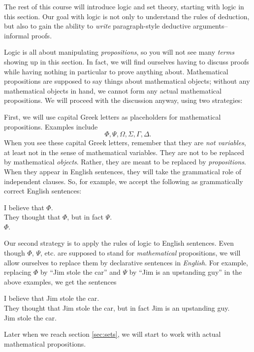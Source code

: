 \documentclass[12pt]{article}
\def\pA{\Phi}
\def\pB{\Psi}
\def\pC{\Omega}
\def\pD{\Sigma}
\def\pE{\Gamma}
\def\pF{\Delta}
\begin{document}
The rest of this course will introduce logic and set theory, starting with logic in this section.
Our goal with logic is not only to understand the rules of deduction,
but also to gain the ability to \emph{write} paragraph-style deductive arguments-- informal proofs.

Logic is all about manipulating \emph{propositions}, so you will not see many \emph{terms} showing up in this section.
In fact, we will find ourselves having to discuss proofs while having nothing in particular to prove anything about.
Mathematical propositions are supposed to say things about mathematical objects;
without any mathematical objects in hand, we cannot form any actual mathematical propositions.
We will proceed with the discussion anyway, using two strategies:

First, we will use capital Greek letters as placeholders for mathematical propositions. Examples include
$$
\pA,
\pB,
\pC,
\pD,
\pE,
\pF.
$$
When you see these capital Greek letters, remember that they are \emph{not variables},
at least not in the sense of mathematical variables. They are not to be replaced by mathematical \emph{objects}.
Rather, they are meant to be replaced by \emph{propositions}.
When they appear in English sentences, they will take the grammatical role of independent clauses.
So, for example, we accept the following as grammatically correct English sentences:
\begin{adjustwidth}{2em}{}
I believe that $\pA$.\\
They thought that $\pA$, but in fact $\pB$.\\
$\pA$.
\end{adjustwidth}

Our second strategy
is to apply the rules of logic to English sentences.
Even though $\pA$, $\pB$, etc. are supposed to stand for \emph{mathematical} propositions,
we will allow ourselves to replace them by declarative sentences in \emph{English}.
For example, replacing $\pA$ by ``Jim stole the car'' and $\pB$ by ``Jim is an upstanding guy'' in the above examples, we get the sentences
\begin{adjustwidth}{2em}{}
I believe that Jim stole the car.\\
They thought that Jim stole the car, but in fact Jim is an upstanding guy.\\
Jim stole the car.
\end{adjustwidth}
Later when we reach section
\ref{sec:sets}, we will start to work with actual mathematical propositions.
\end{document}
